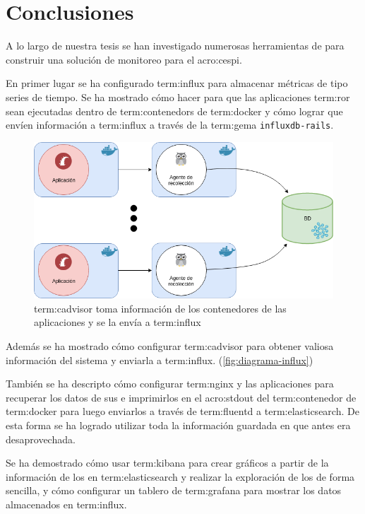 \newpage
\section{Conclusiones}
\label{conclusiones}

A lo largo de nuestra tesis se han investigado numerosas herramientas de
 para construir una solución de monitoreo para el
\gls{acro:cespi}.

En primer lugar se ha configurado \gls{term:influx} para almacenar métricas de
tipo series de tiempo. Se ha mostrado cómo hacer para que las aplicaciones
\gls{term:ror} sean ejecutadas dentro de \glspl{term:contenedor} de
\gls{term:docker} y cómo lograr que envíen información a \gls{term:influx} a
través de la \gls{term:gema} \texttt{influxdb-rails}.

\begin{figure}
  \includegraphics[width=\linewidth]{src/images/conclusiones/influx.png}
  \caption{\gls{term:cadvisor} toma información de los contenedores de las
    aplicaciones y se la envía a \gls{term:influx}}
  \label{fig:diagrama-influx}
\end{figure}

Además se ha mostrado cómo configurar \gls{term:cadvisor} para
obtener valiosa información del sistema y enviarla a \gls{term:influx}.
(\autoref{fig:diagrama-influx})

También se ha descripto cómo configurar \gls{term:nginx} y las aplicaciones
para recuperar los datos de sus  e imprimirlos en el \gls{acro:stdout}
del \gls{term:contenedor} de \gls{term:docker} para luego enviarlos a
través de \gls{term:fluentd} a \gls{term:elasticsearch}. De esta forma se ha
logrado utilizar toda la información guardada en  que antes era
desaprovechada.

Se ha demostrado cómo usar \gls{term:kibana} para crear gráficos a partir de la
información de los  en \gls{term:elasticsearch} y realizar la exploración
de los  de forma sencilla, y cómo configurar un tablero de
\gls{term:grafana} para mostrar los datos almacenados en \gls{term:influx}.

